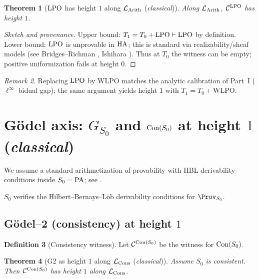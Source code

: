 \documentclass[11pt]{article}
\newtheorem{theorem}{Theorem}[section]
\theoremstyle{definition}
\newtheorem{definition}[theorem]{Definition}
\theoremstyle{remark}
\newtheorem{remark}[theorem]{Remark}
\newcommand{\linf}{\ell^\infty}
\newcommand{\WLPO}{\mathrm{WLPO}}
\begin{document}
\begin{theorem}[\(\mathrm{LPO}\) has height \(1\) along \(\mathcal{L}_{\mathrm{Arith}}\) (\emph{classical})]\label{III:thm:LPO-height1-new}
Along \(\mathcal{L}_{\mathrm{Arith}}\), \(\mathcal C^{\mathrm{LPO}}\) has height \(1\).
\end{theorem}

\begin{proof}[Sketch and provenance]
Upper bound: \(T_1=T_0+\mathrm{LPO}\vdash\mathrm{LPO}\) by definition. Lower bound: \(\mathrm{LPO}\) is unprovable in \(\mathrm{HA}\);
this is standard via realizability/sheaf models (see Bridges--Richman \cite{BridgesRichman}, Ishihara \cite{Ishihara06}).
Thus at \(T_0\) the witness can be empty; positive uniformization fails at height \(0\).
\end{proof}

\begin{remark}
Replacing \(\mathrm{LPO}\) by \(\WLPO\) matches the analytic calibration of Part~I (\(\linf\) bidual gap);
the same argument yields height \(1\) with \(T_1=T_0+\WLPO\).
\end{remark}

\section{G\"odel axis: \(G_{S_0}\) and \(\mathrm{Con}(S_0)\) at height \(1\) (\emph{classical})}

We assume a standard arithmetization of provability with HBL derivability conditions
inside \(S_0=\mathrm{PA}\); see \cite[Ch.~I]{HajekPudlak}.

\begin{assumption}\label{III:ass:HBL-new}
\(S_0\) verifies the Hilbert--Bernays--L\"ob derivability conditions for \(\Prov_{S_0}\).
\end{assumption}

\subsection{G\"odel--2 (consistency) at height \(1\)}

\begin{definition}[Consistency witness]
Let \(\mathcal C^{\mathrm{Con}(S_0)}\) be the witness for \(\mathrm{Con}(S_0)\).
\end{definition}

\begin{theorem}[G2 as height \(1\) along \(\mathcal{L}_{\mathrm{Cons}}\) (\emph{classical})]\label{III:thm:G2-height1-new}
Assume \(S_0\) is consistent. Then \(\mathcal C^{\mathrm{Con}(S_0)}\) has height \(1\) along \(\mathcal{L}_{\mathrm{Cons}}\).
\end{theorem}
\end{document}
